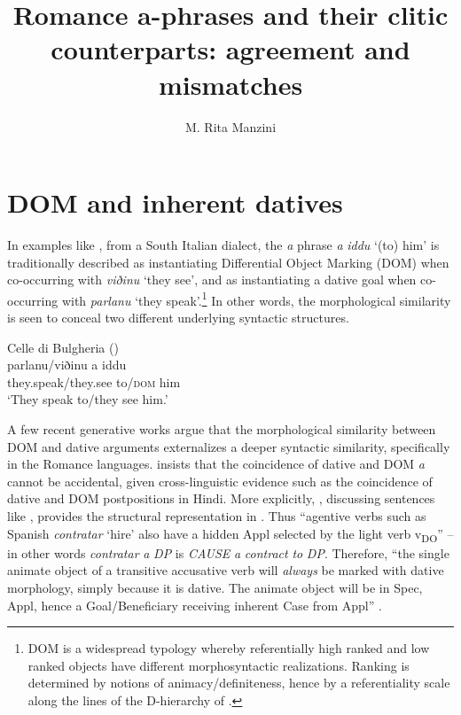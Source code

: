 \documentclass[output=paper]{langscibook}
\author{M. Rita Manzini\affiliation{}}
\title{Romance a-phrases and their clitic counterparts: agreement and mismatches}
\begin{document}
\maketitle 



\section{DOM and inherent datives}

In examples like , from a South Italian dialect, the \textit{a} phrase \textit{a} \textit{iddu} ‘(to) him’ is traditionally described as instantiating Differential Object Marking (DOM) when co-occurring with \textit{viðinu} ‘they see’, and as instantiating a dative goal when co-occurring with \textit{parlanu} ‘they speak’.\footnote{DOM is a widespread typology \citep{Bossong1985} whereby referentially high ranked and low ranked objects have different morphosyntactic realizations. Ranking is determined by notions of animacy/definiteness, hence by a referentiality scale along the lines of the D-hierarchy of \citet{Kiparsky2008}.}   In other words, the morphological similarity is seen to conceal two different underlying syntactic structures.

\ea\label{ex:manzini:1}
{Celle di Bulgheria (\citealt{ManziniSavoia2005})}\\
\gll parlanu/viðinu a iddu\\
they.speak/they.see to/\textsc{dom} him\\
\glt ‘They speak to/they see him.’        
\z

A few recent generative works argue that the morphological similarity between DOM and dative arguments externalizes a deeper syntactic similarity, specifically in the Romance languages. \citet{Torrego1998} insists that the coincidence of dative and DOM \textit{a} cannot be accidental, given cross-linguistic evidence such as the coincidence of dative and DOM postpositions in Hindi. More explicitly, \citet{Torrego2010}, discussing sentences like , provides the structural representation in . Thus “agentive verbs such as Spanish \textit{contratar} ‘hire’ also have a hidden Appl selected by the light verb v\textsubscript{DO}” – in other words \textit{contratar} \textit{a} \textit{DP} is \textit{CAUSE} \textit{a} \textit{contract} \textit{to} \textit{DP}. Therefore, “the single animate object of a transitive accusative verb will \textit{always} be marked with dative morphology, simply because it is dative. The animate object will be in Spec, Appl, hence a Goal/Beneficiary receiving inherent Case from Appl” \citep[462]{Torrego2010}. 
\end{document}
